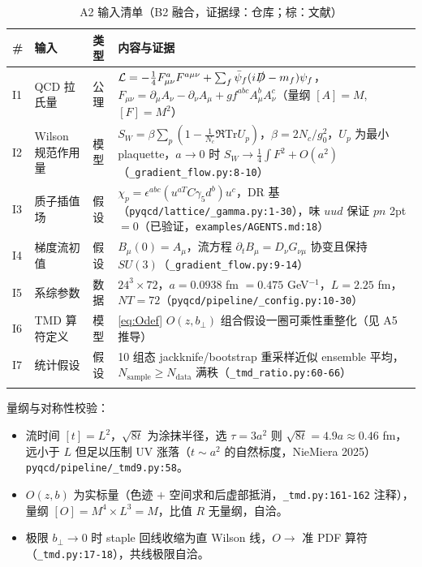 \documentclass[UTF8]{ctexart}
\begin{document}
\tiny
\begin{xltabular}{\textwidth}{lllX}
\toprule
\# & 输入 & 类型 & 内容与证据 \\
\midrule
\endhead
I1 & QCD 拉氏量 & 公理 & $\mathcal{L}= -\frac14 F^{a}_{\mu\nu}F^{a\mu\nu}+\sum_f \bar\psi_f(i\slashed{D}-m_f)\psi_f$，$F_{\mu\nu}= \partial_\mu A_\nu-\partial_\nu A_\mu+gf^{abc}A^b_\mu A^c_\nu$（量纲 $[A]=M$, $[F]=M^2$） \\
I2 & Wilson 规范作用量 & 模型 & $S_W=\beta\sum_p (1-\frac1{N_c}\Re\mathrm{Tr} U_p)$，$\beta=2N_c/g_0^2$，$U_p$ 为最小 plaquette，$a\to0$ 时 $S_W\to \frac14\int F^2+O(a^2)$（\texttt{\nolinkurl{\_gradient\_flow.py:8-10}}） \\
I3 & 质子插值场 & 假设 & $\chi_p=\epsilon^{abc}(u^{aT}C\gamma_5 d^b)u^c$，DR 基（\texttt{\nolinkurl{pyqcd/lattice/\_gamma.py:1-30}}），味 $uud$ 保证 $pn$ 2pt$=0$（已验证，\texttt{\nolinkurl{examples/AGENTS.md:18}}） \\
I4 & 梯度流初值 & 假设 & $B_\mu(0)=A_\mu$，流方程 $\partial_t B_\mu = D_\nu G_{\nu\mu}$ 协变且保持 $SU(3)$（\texttt{\nolinkurl{\_gradient\_flow.py:9-14}}） \\
I5 & 系综参数 & 数据 & $24^3\times72$，$a=0.0938$ fm $=0.475$ GeV$^{-1}$，$L=2.25$ fm，$NT=72$（\texttt{\nolinkurl{pyqcd/pipeline/\_config.py:10-30}}） \\
I6 & TMD 算符定义 & 模型 & \eqref{eq:Odef} $O(z,b_\perp)$ 组合假设一圈可乘性重整化（见 A5 推导） \\
I7 & 统计假设 & 假设 & 10 组态 jackknife/bootstrap 重采样近似 ensemble 平均，$N_{\text{sample}}\ge N_{\text{data}}$ 满秩（\texttt{\nolinkurl{\_tmd\_ratio.py:60-66}}） \\
\bottomrule
\caption{A2 输入清单（B2 融合，证据绿：仓库；棕：文献）}
\end{xltabular}

量纲与对称性校验：
\begin{itemize}
\item 流时间 $[t]=L^2$，$\sqrt{8t}$ 为涂抹半径，选 $\tau=3a^2$ 则 $\sqrt{8t}=4.9a\approx0.46$ fm，远小于 $L$ 但足以压制 UV 涨落（$t\sim a^2$ 的自然标度，NieMiera 2025）\textcolor{evidence}{\texttt{\nolinkurl{pyqcd/pipeline/\_tmd9.py:58}}}。
\item $O(z,b)$ 为实标量（色迹 $+$ 空间求和后虚部抵消，\texttt{\nolinkurl{\_tmd.py:161-162}} 注释），量纲 $[O]=M^4\times L^3 = M$，比值 $R$ 无量纲，自洽。
\item 极限 $b_\perp\to0$ 时 staple 回线收缩为直 Wilson 线，$O\to$ 准 PDF 算符（\texttt{\nolinkurl{\_tmd.py:17-18}}），共线极限自洽。
\end{itemize}
\end{document}
